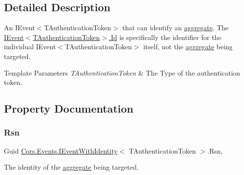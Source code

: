 \subsection{Detailed Description}
An I\+Event$<$\+T\+Authentication\+Token$>$ that can identify an \hyperlink{}{aggregate}. The \hyperlink{interfaceCqrs_1_1Events_1_1IEvent_a2974e13d307c62c5cc438d668ff1783b_a2974e13d307c62c5cc438d668ff1783b}{I\+Event$<$\+T\+Authentication\+Token$>$.\+Id} is specifically the identifier for the individual I\+Event$<$\+T\+Authentication\+Token$>$ itself, not the \hyperlink{}{aggregate} being targeted. 


\begin{DoxyTemplParams}{Template Parameters}
{\em T\+Authentication\+Token} & The Type of the authentication token.\\
\hline
\end{DoxyTemplParams}


\subsection{Property Documentation}
\mbox{\label{interfaceCqrs_1_1Events_1_1IEventWithIdentity_a4d87d8dd7304f4ce31ad8bcbf3f96789_a4d87d8dd7304f4ce31ad8bcbf3f96789}} 
\subsubsection{\texorpdfstring{Rsn}{Rsn}}
{\footnotesize\ttfamily Guid \hyperlink{interfaceCqrs_1_1Events_1_1IEventWithIdentity}{Cqrs.\+Events.\+I\+Event\+With\+Identity}$<$ T\+Authentication\+Token $>$.Rsn\hspace{0.3cm}{\ttfamily [get]}, {\ttfamily [set]}}



The identity of the \hyperlink{}{aggregate} being targeted. 

